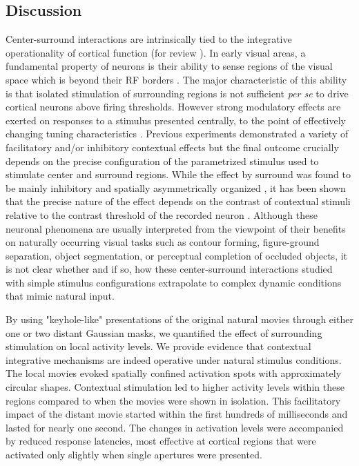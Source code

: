 \subsection{Discussion}

Center-surround interactions are intrinsically tied to the integrative
operationality of cortical function (for review \cite{allman1985a,
series2003a, albright2002a}). In early visual areas, a fundamental property
of neurons is their ability to sense regions of the visual space which is
beyond their RF borders \citep{fitzpatrick2000a}. The major characteristic
of this ability is that isolated stimulation of surrounding regions is not
sufficient \textit{per se} to drive cortical neurons above firing
thresholds. However strong modulatory effects are exerted on responses to a
stimulus presented centrally, to the point of effectively changing tuning
characteristics \citep{sillito1995a}. Previous experiments demonstrated a
variety of facilitatory and/or inhibitory contextual effects but the final
outcome crucially depends on the precise configuration of the parametrized
stimulus used to stimulate center and surround regions. While the effect by
surround was found to be mainly inhibitory \citep{Hubel1965a, Maffei1976a,
Jones2001a} and spatially asymmetrically organized \citep{Walker1999a}, it
has been shown that the precise nature of the effect depends on the
contrast of contextual stimuli relative to the contrast threshold of the
recorded neuron \citep{toth1996a, sengpiel1997a, kapadia1999a}. Although
these neuronal phenomena are usually interpreted from the viewpoint of
their benefits on naturally occurring visual tasks such as contour forming,
figure-ground separation, object segmentation, or perceptual completion of
occluded objects, it is not clear whether \textemdash and if so, how
\textemdash these center-surround interactions studied with simple stimulus
configurations extrapolate to complex dynamic conditions that mimic natural
input.

By using "keyhole-like" presentations of the original natural movies
through either one or two distant Gaussian masks, we quantified the effect
of surrounding stimulation on local activity levels. We provide evidence
that contextual integrative mechanisms are indeed operative under natural
stimulus conditions. The local movies evoked spatially confined activation
spots with approximately circular shapes. Contextual stimulation led to
higher activity levels within these regions compared to when the movies
were shown in isolation. This facilitatory impact of the distant movie
started within the first hundreds of milliseconds and lasted for nearly one
second. The changes in activation levels were accompanied by reduced
response latencies, most effective at cortical regions that were activated
only slightly when single apertures were presented.

